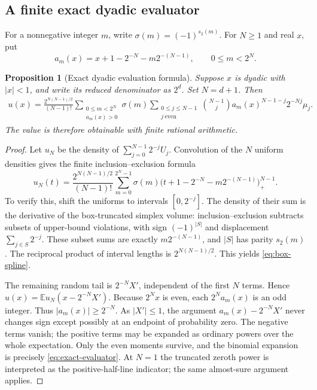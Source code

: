 \documentclass[11pt,a4paper]{article}
\numberwithin{equation}{section}
\newtheorem{proposition}[theorem]{Proposition}
\theoremstyle{definition}
\theoremstyle{remark}
\begin{document}
\subsection{A finite exact dyadic evaluator}

For a nonnegative integer $m$, write $\sigma(m)=(-1)^{s_2(m)}$.
For $N\ge1$ and real $x$, put
\begin{equation}
 a_m(x)=x+1-2^{-N}-m2^{-(N-1)},\qquad 0\le m<2^N.
 \label{eq:cell-offset}
\end{equation}

\begin{proposition}[Exact dyadic evaluation formula]
\label{prop:dyadic-evaluator}
Suppose $x$ is dyadic with $|x|<1$, and write its reduced denominator
as $2^d$. Set $N=d+1$. Then
\begin{equation}
 \begin{split}
 u(x)=\frac{2^{N(N-1)/2}}{(N-1)!}
 \sum_{\substack{0\le m<2^N\\a_m(x)>0}}\sigma(m)
 \sum_{\substack{0\le j\le N-1\\j\ \mathrm{even}}}
 \binom{N-1}{j}
 a_m(x)^{N-1-j}2^{-Nj}\mu_j.
 \end{split}
 \label{eq:exact-evaluator}
\end{equation}
The value is therefore obtainable with finite rational arithmetic.
\end{proposition}

\begin{proof}
Let $u_N$ be the density of $\sum_{j=0}^{N-1}2^{-j}U_j$.
Convolution of the $N$ uniform densities gives the finite
inclusion--exclusion formula
\begin{equation}
 u_N(t)=\frac{2^{N(N-1)/2}}{(N-1)!}
 \sum_{m=0}^{2^N-1}\sigma(m)
 \bigl(t+1-2^{-N}-m2^{-(N-1)}\bigr)_+^{N-1}.
 \label{eq:box-spline}
\end{equation}
To verify this, shift the uniforms to intervals $[0,2^{-j}]$.
The density of their sum is the derivative of the box-truncated simplex
volume: inclusion--exclusion subtracts subsets of upper-bound violations,
with sign $(-1)^{|S|}$ and displacement $\sum_{j\in S}2^{-j}$.
These subset sums are exactly $m2^{-(N-1)}$, and $|S|$ has parity
$s_2(m)$. The reciprocal product of interval lengths is
$2^{N(N-1)/2}$. This yields \eqref{eq:box-spline}.

The remaining random tail is $2^{-N}X'$, independent of the first
$N$ terms. Hence $u(x)=\mathbb E u_N(x-2^{-N}X')$.
Because $2^Nx$ is even, each $2^Na_m(x)$ is an odd integer. Thus
$|a_m(x)|\ge2^{-N}$. As $|X'|\le1$, the argument
$a_m(x)-2^{-N}X'$ never changes sign except possibly at an endpoint
of probability zero. The negative terms vanish; the positive terms
may be expanded as ordinary powers over the whole expectation.
Only the even moments survive, and the binomial expansion is precisely
\eqref{eq:exact-evaluator}. At $N=1$ the truncated zeroth power is
interpreted as the positive-half-line indicator; the same almost-sure
argument applies.
\end{proof}
\end{document}
